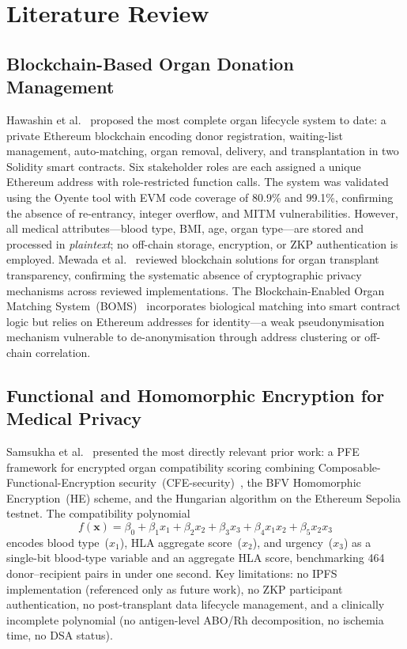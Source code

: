\documentclass[10pt,twocolumn,a4paper]{article}
\begin{document}
\section{Literature Review}
\label{sec:litreview}

\subsection{Blockchain-Based Organ Donation Management}

Hawashin et al.~\cite{hawashin2022} proposed the most complete organ lifecycle system
to date: a private Ethereum blockchain encoding donor registration, waiting-list
management, auto-matching, organ removal, delivery, and transplantation in two Solidity
smart contracts. Six stakeholder roles are each assigned a unique Ethereum address with
role-restricted function calls. The system was validated using the Oyente tool with
EVM code coverage of 80.9\% and 99.1\%, confirming the absence of re-entrancy,
integer overflow, and MITM vulnerabilities. However, all medical attributes---blood
type, BMI, age, organ type---are stored and processed in \emph{plaintext}; no
off-chain storage, encryption, or ZKP authentication is employed. Mewada et
al.~\cite{mewada2026} reviewed blockchain solutions for organ transplant transparency,
confirming the systematic absence of cryptographic privacy mechanisms across reviewed
implementations. The Blockchain-Enabled Organ Matching System~(BOMS)~\cite{boms2024}
incorporates biological matching into smart contract logic but relies on Ethereum
addresses for identity---a weak pseudonymisation mechanism vulnerable to
de-anonymisation through address clustering or off-chain correlation.

\subsection{Functional and Homomorphic Encryption for Medical Privacy}

Samsukha et al.~\cite{samsukha2025} presented the most directly relevant prior work:
a PFE framework for encrypted organ compatibility scoring combining
Composable-Functional-Encryption security~(CFE-security)~\cite{matt2015}, the BFV
Homomorphic Encryption~(HE) scheme, and the Hungarian algorithm on the Ethereum
Sepolia testnet. The compatibility polynomial
\begin{equation}
  f(\mathbf{x}) = \beta_0 + \beta_1 x_1 + \beta_2 x_2 + \beta_3 x_3
                + \beta_4 x_1 x_2 + \beta_5 x_2 x_3
  \label{eq:pfe-samsukha}
\end{equation}
encodes blood type~($x_1$), HLA aggregate score~($x_2$), and urgency~($x_3$) as a
single-bit blood-type variable and an aggregate HLA score, benchmarking 464
donor--recipient pairs in under one second. Key limitations: no IPFS implementation
(referenced only as future work), no ZKP participant authentication, no post-transplant
data lifecycle management, and a clinically incomplete polynomial (no antigen-level
ABO/Rh decomposition, no ischemia time, no DSA status).
\end{document}
